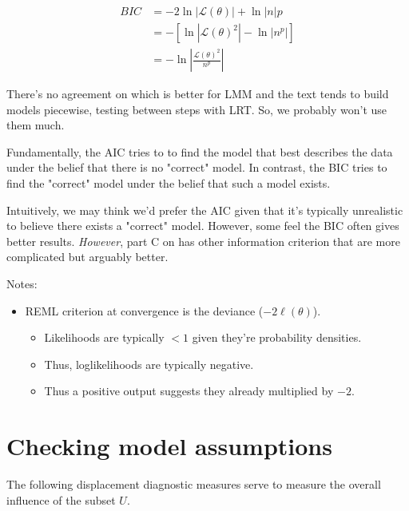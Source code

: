 \documentclass[english]{article}
\begin{document}
\begin{multicols*}{2}
\begin{align*}
	BIC
	&=	-2\ln|\mathcal{L}(\theta)| + \ln|n|p	\\
	&=	-\left[\ln\left|\mathcal{L}(\theta)^{2}\right| - \ln\left|n^{p}\right|\right]	\\
	&=	-\ln\left|\frac{\mathcal{L}(\theta)^{2}}{n^{p}}\right|	
\end{align*}

\bigskip

\begin{rappel_enhanced}[Context]
There's no agreement on which is better for LMM and the text tends to build models piecewise, testing between steps with LRT. So, we probably won't use them much.

\bigskip

Fundamentally, the AIC tries to to find the model that best describes the data under the belief that there is no "correct" model. In contrast, the BIC tries to find the "correct" model under the belief that such a model exists. 

\bigskip

Intuitively, we may think we'd prefer the AIC given that it's typically unrealistic to believe there exists a "correct" model. However, some feel the BIC often gives better results. \textit{However}, part C on \textit{\underline{}} has other information criterion that are more complicated but arguably better. 
\end{rappel_enhanced}


\bigskip

Notes:
\begin{itemize}
	\item	REML criterion at convergence is the deviance ($-2\ell(\theta)$).
		\begin{itemize}
		\item	Likelihoods are typically $<1$ given they're probability densities.
		\item	Thus, loglikelihoods are typically negative.
		\item	Thus a positive output suggests they already multiplied by $-2$.
		\end{itemize}
\end{itemize}



\section{Checking model assumptions}
The following displacement diagnostic measures serve to measure the overall influence of the subset $U$.


\end{multicols*}
\end{document}
